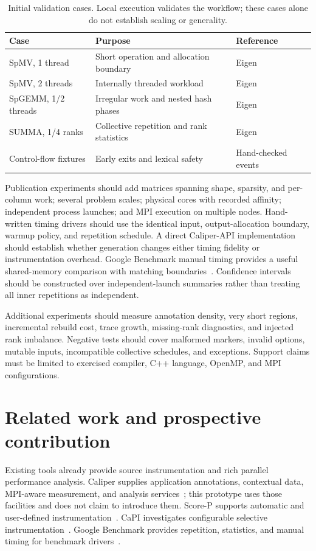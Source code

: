 \documentclass[10pt]{article}
\begin{document}
\begin{table}[ht]
\centering
\begin{tabular}{lll}
\toprule
Case & Purpose & Reference \\
\midrule
SpMV, 1 thread & Short operation and allocation boundary & Eigen \\
SpMV, 2 threads & Internally threaded workload & Eigen \\
SpGEMM, 1/2 threads & Irregular work and nested hash phases & Eigen \\
SUMMA, 1/4 ranks & Collective repetition and rank statistics & Eigen \\
Control-flow fixtures & Early exits and lexical safety & Hand-checked events \\
\bottomrule
\end{tabular}
\caption{Initial validation cases. Local execution validates the workflow; these
cases alone do not establish scaling or generality.}
\end{table}

Publication experiments should add matrices spanning shape, sparsity, and per-column
work; several problem scales; physical cores with recorded affinity; independent
process launches; and MPI execution on multiple nodes. Hand-written timing drivers
should use the identical input, output-allocation boundary, warmup policy, and
repetition schedule. A direct Caliper-API implementation should establish whether
generation changes either timing fidelity or instrumentation overhead. Google
Benchmark manual timing provides a useful shared-memory comparison with matching
boundaries~\cite{googlebenchmark}. Confidence intervals should be constructed over
independent-launch summaries rather than treating all inner repetitions as independent.

Additional experiments should measure annotation density, very short regions,
incremental rebuild cost, trace growth, missing-rank diagnostics, and injected rank
imbalance. Negative tests should cover malformed markers, invalid options, mutable
inputs, incompatible collective schedules, and exceptions. Support claims must be
limited to exercised compiler, C++ language, OpenMP, and MPI configurations.

\section{Related work and prospective contribution}
Existing tools already provide source instrumentation and rich parallel performance
analysis. Caliper supplies application annotations, contextual data, MPI-aware
measurement, and analysis services~\cite{caliper}; this prototype uses those facilities
and does not claim to introduce them. Score-P supports automatic and user-defined
instrumentation~\cite{scorepmanual}. CaPI investigates configurable selective
instrumentation~\cite{capi}. Google Benchmark provides repetition, statistics,
and manual timing for benchmark drivers~\cite{googlebenchmark}.
\end{document}
